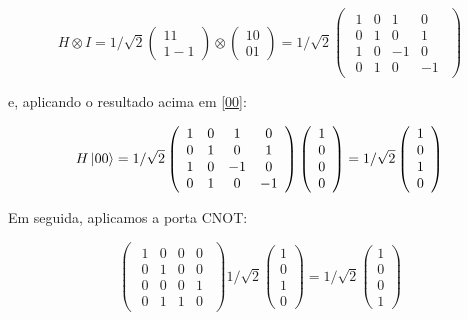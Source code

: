 \documentclass[11pt,oneside,brazil,hidelinks,article,sumario=tradicional,a4paper]{abntex2}
\begin{document}
\begin{equation}
H \otimes I = 1/\sqrt{2} \left(\begin{array}{l}
1 1 \\
1 -1 
\end{array}\right) \otimes \left(\begin{array}{l}
1 0 \\
0 1
\end{array}\right) = 1/\sqrt{2} \left(\begin{array}{l}
\begin{matrix}
1 & 0 & 1 & 0 \\
0 & 1 & 0 & 1 \\
1 & 0 & -1 & 0 \\
0 & 1 & 0 & -1
\end{matrix}
\end{array}\right)
\end{equation}

e, aplicando o resultado acima em \ref{00}:

\begin{equation}
H \ket{00} = 1/\sqrt{2} \left(\begin{array}{l}
\begin{matrix}
1 & 0 & 1 & 0 \\
0 & 1 & 0 & 1 \\
1 & 0 & -1 & 0 \\
0 & 1 & 0 & -1
\end{matrix}
\end{array}\right) \left(\begin{array}{l}
1 \\
0 \\
0 \\
0
\end{array}\right) = 1/\sqrt{2} \left(\begin{array}{l}
1 \\
0 \\
1 \\
0
\end{array}\right)
\end{equation}

Em seguida, aplicamos a porta CNOT:

\begin{equation}
\left(\begin{array}{l}
\begin{matrix}
1 & 0 & 0 & 0 \\
0 & 1 & 0 & 0 \\
0 & 0 & 0 & 1 \\
0 & 1 & 1 & 0
\end{matrix}
\end{array}\right) 
1/\sqrt{2}\left(\begin{array}{l}
1 \\
0 \\
1 \\
0
\end{array}\right) = 1/\sqrt{2} \left(\begin{array}{l}
1 \\
0 \\
0 \\
1
\end{array}\right)
\end{equation}
\end{document}
